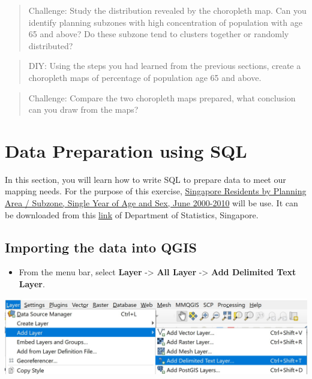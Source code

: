 \documentclass[
  letterpaper,
  DIV=11,
  numbers=noendperiod]{scrreprt}
\providecommand{\tightlist}{%
  \setlength{\itemsep}{0pt}\setlength{\parskip}{0pt}}\usepackage{longtable,booktabs,array}
\begin{document}
\begin{quote}
Challenge: Study the distribution revealed by the choropleth map. Can
you identify planning subzones with high concentration of population
with age 65 and above? Do these subzone tend to clusters together or
randomly distributed?
\end{quote}

\begin{quote}
DIY: Using the steps you had learned from the previous sections, create
a choropleth maps of percentage of population age 65 and above.
\end{quote}

\begin{quote}
Challenge: Compare the two choropleth maps prepared, what conclusion can
you draw from the maps?
\end{quote}

\hypertarget{data-preparation-using-sql}{%
\section{Data Preparation using SQL}\label{data-preparation-using-sql}}

In this section, you will learn how to write SQL to prepare data to meet
our mapping needs. For the purpose of this exercise,
\href{https://www.singstat.gov.sg/-/media/files/find_data/population/statistical_tables/respopagesex2000to2010.ashx}{Singapore
Residents by Planning Area / Subzone, Single Year of Age and Sex, June
2000-2010} will be use. It can be downloaded from this
\href{https://www.singstat.gov.sg/find-data/search-by-theme/population/geographic-distribution/latest-data}{link}
of Department of Statistics, Singapore.

\hypertarget{importing-the-data-into-qgis}{%
\subsection{Importing the data into
QGIS}\label{importing-the-data-into-qgis}}

\begin{itemize}
\tightlist
\item
  From the menu bar, select \textbf{Layer} -\textgreater{} \textbf{All
  Layer} -\textgreater{} \textbf{Add Delimited Text Layer}.
\end{itemize}

\includegraphics{./img03/image37.jpg}
\end{document}
